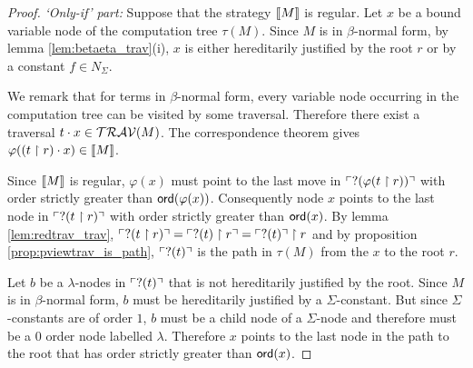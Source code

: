 \begin{proof}
\noindent  \emph{`Only-if' part:} Suppose that the strategy ${[\![ M ]\!]}$ is regular.
Let $x$ be a bound variable node of the computation tree $\tau(M)$.
Since $M$ is in $\beta$-normal form, by lemma \ref{lem:betaeta_trav}(i),
$x$ is either hereditarily justified by the root $r$ or by a constant $f \in N_\Sigma$.

We remark that for terms in $\beta$-normal form, every variable node occurring in the computation tree can be visited by some traversal.
Therefore there exist a traversal $t \cdot x \in \mathcal{TRAV}(M)$.
The correspondence theorem gives $\varphi((t \upharpoonright r) \cdot x) \in {[\![M ]\!]}$.

Since ${[\![ M ]\!]}$ is regular, $\varphi(x)$ must point to the last move in $\ulcorner ?(\varphi(t \upharpoonright r)) \urcorner$ with
order strictly greater than ${\sf ord}(\varphi(x))$.
Consequently node $x$ points to the last node in $\ulcorner ?(t \upharpoonright r) \urcorner$ with
order strictly greater than ${\sf ord}(x)$.
By lemma \ref{lem:redtrav_trav}, $\ulcorner ?(t \upharpoonright r) \urcorner = \ulcorner ?(t) \upharpoonright r \urcorner = \ulcorner ?(t) \urcorner \upharpoonright r$
and by proposition \ref{prop:pviewtrav_is_path}, $\ulcorner ?(t) \urcorner$ is
the path in $\tau(M)$ from the $x$ to the root $r$.

Let $b$ be a $\lambda$-nodes in $\ulcorner ?(t) \urcorner$ that is not hereditarily justified by the root.
Since $M$ is in $\beta$-normal form, $b$ must be hereditarily justified by a $\Sigma$-constant.
But since $\Sigma$-constants are of order $1$, $b$ must be a child node of a $\Sigma$-node and therefore must be a $0$ order node labelled $\lambda$.
Therefore $x$ points to the last node in the path to the root that has order strictly greater than ${\sf ord}(x)$.
\end{proof}



